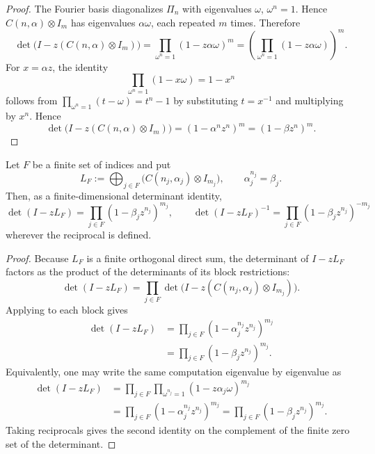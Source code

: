 \begin{proof}
  The Fourier basis diagonalizes \(\Pi_n\) with eigenvalues
  \(\omega\), \(\omega^n=1\). Hence \(C(n,\alpha)\otimes I_m\) has
  eigenvalues \(\alpha\omega\), each repeated \(m\) times. Therefore
  \[
    \det\!\bigl(I-z(C(n,\alpha)\otimes I_m)\bigr)
    =\prod_{\omega^n=1}(1-z\alpha\omega)^m
    =\left(\prod_{\omega^n=1}(1-z\alpha\omega)\right)^m.
  \]
  For \(x=\alpha z\), the identity
  \[
    \prod_{\omega^n=1}(1-x\omega)=1-x^n
  \]
  follows from \(\prod_{\omega^n=1}(t-\omega)=t^n-1\) by substituting
  \(t=x^{-1}\) and multiplying by \(x^n\). Hence
  \[
    \det\!\bigl(I-z(C(n,\alpha)\otimes I_m)\bigr)
    =(1-\alpha^nz^n)^m
    =(1-\beta z^n)^m .
  \]
\end{proof}

\begin{lemma}
  \label{lem:finite-cyclic-truncation-determinant}
  Let \(F\) be a finite set of indices and put
  \[
    L_F:=\bigoplus_{j\in F}\bigl(C(n_j,\alpha_j)\otimes I_{m_j}\bigr),
    \qquad \alpha_j^{n_j}=\beta_j.
  \]
  Then, as a finite-dimensional determinant identity,
  \[
    \det(I-zL_F)
    =\prod_{j\in F}(1-\beta_j z^{n_j})^{m_j},
    \qquad
    \det(I-zL_F)^{-1}
    =\prod_{j\in F}(1-\beta_j z^{n_j})^{-m_j}
  \]
  wherever the reciprocal is defined.
\end{lemma}

\begin{proof}
  Because \(L_F\) is a finite orthogonal direct sum, the determinant of
  \(I-zL_F\) factors as the product of the determinants of its block
  restrictions:
  \[
    \det(I-zL_F)
    =\prod_{j\in F}
      \det\!\bigl(I-z(C(n_j,\alpha_j)\otimes I_{m_j})\bigr).
  \]
  Applying  to each block gives
  \begin{align*}
    \det(I-zL_F)
    &=\prod_{j\in F}(1-\alpha_j^{n_j}z^{n_j})^{m_j} \\
    &=\prod_{j\in F}(1-\beta_j z^{n_j})^{m_j}.
  \end{align*}
  Equivalently, one may write the same computation eigenvalue by
  eigenvalue as
  \begin{align*}
    \det(I-zL_F)
    &=\prod_{j\in F}\prod_{\omega^{n_j}=1}
      (1-z\alpha_j\omega)^{m_j} \\
    &=\prod_{j\in F}(1-\alpha_j^{n_j}z^{n_j})^{m_j}
      =\prod_{j\in F}(1-\beta_j z^{n_j})^{m_j}.
  \end{align*}
  Taking reciprocals gives the second identity on the complement of the
  finite zero set of the determinant.
\end{proof}

